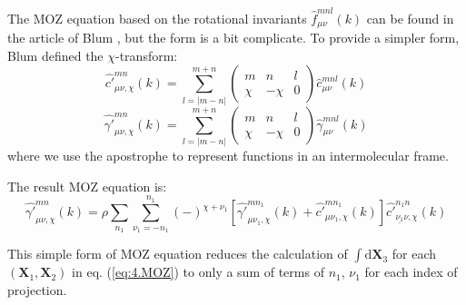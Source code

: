 The \acs{MOZ} equation based on the rotational invariants $\hat{f}_{\mu\nu}^{mnl}(k)$
can be found in the article of Blum \citep{Blum_I}, but the form
is a bit complicate. To provide a simpler form, Blum defined the $\chi$-transform:
\begin{equation}
\hat{c'}_{\mu\nu,\chi}^{mn}(k)=\sum_{l=\left|m-n\right|}^{m+n}\left(\begin{array}{ccc}
m & n & l\\
\chi & -\chi & 0
\end{array}\right)\hat{c}_{\mu\nu}^{mnl}(k)
\end{equation}
\begin{equation}
\hat{\gamma'}_{\mu\nu,\chi}^{mn}(k)=\sum_{l=\left|m-n\right|}^{m+n}\left(\begin{array}{ccc}
m & n & l\\
\chi & -\chi & 0
\end{array}\right)\hat{\gamma}_{\mu\nu}^{mnl}(k)
\end{equation}
where we use the apostrophe to represent functions in an intermolecular
frame. 

The result \acs{MOZ} equation is:
\begin{equation}
\hat{\gamma'}_{\mu\nu,\chi}^{mn}(k)=\rho\sum_{n_{1}}\sum_{\nu_{1}=-n_{1}}^{n_{1}}(-)^{\chi+\nu_{1}}\left[\hat{\gamma'}_{\mu\nu_{1},\chi}^{mn_{1}}(k)+\hat{c'}_{\mu\nu_{1},\chi}^{mn_{1}}(k)\right]\hat{c'}_{\underline{\nu_{1}}\nu,\chi}^{n_{1}n}(k)
\end{equation}

This simple form of \acs{MOZ} equation reduces the calculation of
$\int\mathrm{d}\mathbf{X}_{3}$ for each $(\mathbf{X}_{1},\mathbf{X}_{2})$
in eq. (\ref{eq:4.MOZ}) to only a sum of terms of $n_{1}$, $\nu_{1}$
for each index of projection.
